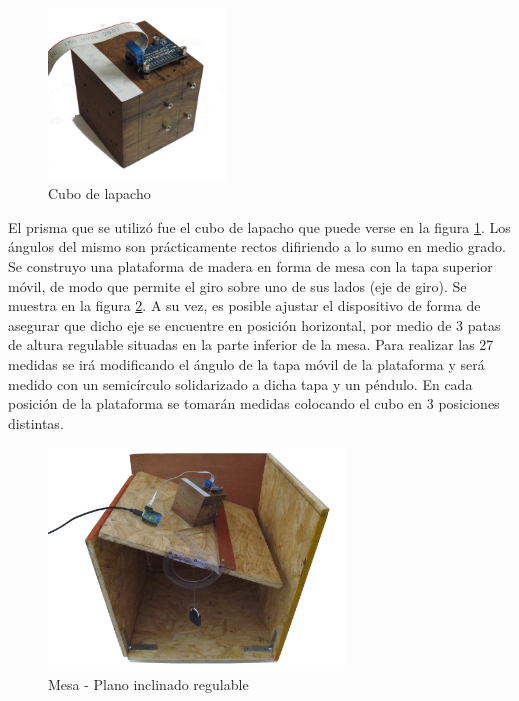 \documentclass[main]{subfiles}
\begin{document}
\begin{figure}
  \vspace{-20pt}
  \begin{center}
    \includegraphics[width=0.42\textwidth]{./pics_acc/cubo.png}
  \end{center}
  \vspace{-20pt}
  \caption{Cubo de lapacho}
  \label{fig:cubo}
\end{figure}

El prisma que se utilizó fue el cubo de lapacho que puede verse en la figura \ref{fig:cubo}. Los ángulos del mismo son prácticamente rectos difiriendo a lo sumo en medio grado. \\

Se construyo una plataforma de madera en forma de mesa con la tapa superior móvil, de modo que permite el giro sobre uno de sus lados (eje de giro). Se muestra en la figura \ref{fig:mesa-flotando}.  A su vez, es posible ajustar el dispositivo de forma de asegurar que dicho eje se encuentre en posición horizontal, por medio de 3 patas de altura regulable situadas en la parte inferior de la mesa. Para realizar las 27 medidas se irá modificando el ángulo de la tapa móvil de la plataforma y será medido con un semicírculo solidarizado a dicha tapa y un péndulo. En cada posición de la plataforma se tomarán medidas colocando el cubo en 3 posiciones distintas.

\begin{figure}[h!]
	\begin{center}
		\includegraphics[width=0.7\textwidth]{./pics_acc/mesa-flotando.jpg}
	\end{center}
	\vspace{-20pt}
	\caption{Mesa - Plano inclinado regulable}
	\label{fig:mesa-flotando}
\end{figure}
\end{document}
